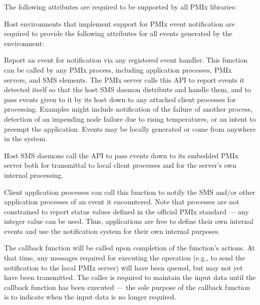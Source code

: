 \reqattrstart
The following attributes are required to be supported by all \ac{PMIx} libraries:


\divider

Host environments that implement support for \ac{PMIx} event notification are required to provide the following attributes for all events generated by the environment:


\reqattrend

\descr

Report an event for notification via any registered event handler. This function can be called by any \ac{PMIx} process, including application processes, \ac{PMIx} servers, and \ac{SMS} elements. The \ac{PMIx} server calls this \ac{API} to report events it detected itself so that the host \ac{SMS} daemon distribute and handle them, and to pass events given to it by its host down to any attached client processes for processing. Examples might include notification of the failure of another process, detection of an impending node failure due to rising temperatures, or an intent to preempt the application. Events may be locally generated or come from anywhere in the system.

Host \ac{SMS} daemons call the API to pass events down to its embedded \ac{PMIx} server both for transmittal to local client processes and for the server's own internal processing.

Client application processes can call this function to notify the \ac{SMS} and/or other application processes of an event it encountered. Note that processes are not constrained to report status values defined in the official \ac{PMIx} standard --- any integer value can be used. Thus, applications are free to define their own internal events and use the notification system for their own internal purposes.

\adviceuserstart
The callback function will be called upon completion of the
 function's actions. At that time, any messages required for executing the operation (e.g., to send the notification to the local \ac{PMIx} server) will
have been queued, but may not yet have been transmitted. The caller is required to maintain the input
data until the callback function has been executed --- the sole purpose of the callback function is to indicate when the input data is no longer required.
\adviceuserend


